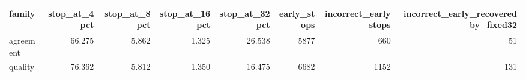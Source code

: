 \begin{tabular}{lrrrrrrr}
\toprule
family & stop\_at\_4\_pct & stop\_at\_8\_pct & stop\_at\_16\_pct & stop\_at\_32\_pct & early\_stops & incorrect\_early\_stops & incorrect\_early\_recovered\_by\_fixed32 \\
\midrule
agreement & 66.275 & 5.862 & 1.325 & 26.538 & 5877 & 660 & 51 \\
quality & 76.362 & 5.812 & 1.350 & 16.475 & 6682 & 1152 & 131 \\
\bottomrule
\end{tabular}

